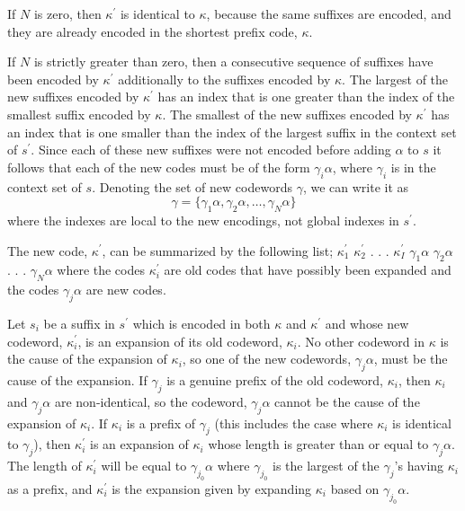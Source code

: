 \documentclass[a4paper,11pt]{report}
\begin{document}
If $N$ is zero, then $\kappa^\prime$ is identical to $\kappa$, because the same suffixes are encoded, and they are already
encoded in the shortest prefix code, $\kappa$.

If $N$ is strictly greater than zero, then a consecutive sequence of suffixes have been encoded by $\kappa^\prime$
additionally to the suffixes encoded by $\kappa$. The largest of the new suffixes encoded by $\kappa^\prime$ has an index
that is one greater than the index of the smallest suffix encoded by $\kappa$. The smallest of the new suffixes encoded by
$\kappa^\prime$ has an index that is one smaller than the index of the largest suffix in the context set of $s^\prime$.
Since each of these new suffixes were not encoded before adding $\alpha$ to $s$ it follows that each of the new codes
must be of the form $\gamma_i \alpha$, where $\gamma_i$ is in the context set of $s$. Denoting the set of new codewords
$\gamma$, we can write it as
$$
\gamma = \{\gamma_1 \alpha, \gamma_2 \alpha, \ldots, \gamma_N \alpha\}
$$
where the indexes are local to the new encodings, not global indexes in $s^\prime$.

The new code, $\kappa^\prime$, can be summarized by the following list;\hfill\break
\vskip0.5cm\noindent
$\kappa_1^\prime$\hfill\break
$\kappa_2^\prime$\hfill\break
$.$\hfill\break
$.$\hfill\break
$.$\hfill\break
$\kappa_I^\prime$\hfill\break
$\gamma_1 \alpha$\hfill\break
$\gamma_2 \alpha$\hfill\break
$.$\hfill\break
$.$\hfill\break
$.$\hfill\break
$\gamma_N \alpha$\hfill\break
\vskip0.5cm\noindent
where the codes $\kappa_i^\prime$ are old codes that have possibly been expanded and the codes $\gamma_j \alpha$ are
new codes.

Let $s_i$ be a suffix in $s^\prime$ which is encoded in both $\kappa$ and $\kappa^\prime$ and whose new codeword,
$\kappa_i^\prime$, is an expansion of its old codeword, $\kappa_i$. No other codeword in $\kappa$ is the cause of the
expansion of $\kappa_i$, so one of the new codewords, $\gamma_j \alpha$, must be the cause of the expansion. If $\gamma_j$ is
a genuine prefix of the old codeword, $\kappa_i$, then $\kappa_i$ and $\gamma_j \alpha$ are non-identical, so the
codeword, $\gamma_j \alpha$ cannot be the cause of the expansion of $\kappa_i$. If $\kappa_i$ is a prefix of $\gamma_j$
(this includes the case where $\kappa_i$ is identical to $\gamma_j$), then $\kappa_i^\prime$ is an expansion of $\kappa_i$
whose length is greater than or equal to $\gamma_j \alpha$. The length of $\kappa_i^\prime$ will be equal to
$\gamma_{j_0} \alpha$ where $\gamma_{j_0}$ is the largest of the $\gamma_j$'s having $\kappa_i$ as a prefix, and
$\kappa_i^\prime$ is the expansion given by expanding $\kappa_i$ based on $\gamma_{j_0} \alpha$.
\end{document}
